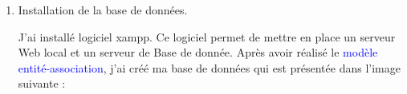 \documentclass{article}
\begin{document}
\begin{enumerate}
\begin{enumerate}
               \vspace{1.6cm}
               \hspace*{-1.05in}
               \noindent{}
               
               
               
               
                \vspace{1.6cm}
                 \item \textcolor{amethyst}{Installation de la base de données}.
           \vspace{0.4cm}
           
           
            \setlength{\parindent}{1cm}  J'ai installé logiciel xampp. Ce logiciel permet de mettre en place un serveur Web local et un serveur de Base de donnée. Après avoir réalisé le \textcolor{blue}{modèle entité-association}, j'ai créé ma base de données qui est présentée dans l'image suivante :
            
            
            
            \hspace*{-1.05in}
               \noindent{}
         

\end{enumerate}
\end{enumerate}
\end{document}
